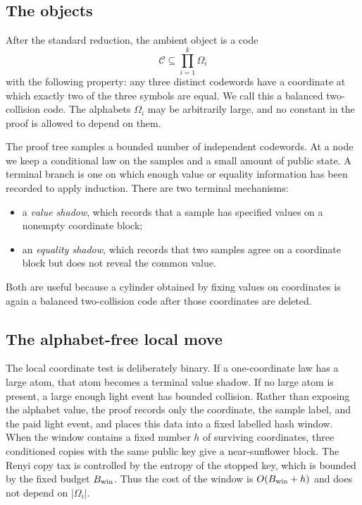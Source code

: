\documentclass[11pt]{article}
\theoremstyle{remark}
\newcommand{\C}{\mathcal C}
\begin{document}
\subsection*{The objects}

After the standard reduction, the ambient object is a code
\[
        \C\subseteq \prod_{i=1}^{k}\Omega_i
\]
with the following property: any three distinct codewords have a coordinate at
which exactly two of the three symbols are equal.  We call this a balanced
two-collision code.  The alphabets $\Omega_i$ may be arbitrarily large, and no
constant in the proof is allowed to depend on them.

The proof tree samples a bounded number of independent codewords.  At a node we
keep a conditional law on the samples and a small amount of public state.  A
terminal branch is one on which enough value or equality information has been
recorded to apply induction.  There are two terminal mechanisms:
\begin{itemize}[leftmargin=2em]
\item a \emph{value shadow}, which records that a sample has specified values
on a nonempty coordinate block;
\item an \emph{equality shadow}, which records that two samples agree on a
coordinate block but does not reveal the common value.
\end{itemize}
Both are useful because a cylinder obtained by fixing values on coordinates is
again a balanced two-collision code after those coordinates are deleted.

\subsection*{The alphabet-free local move}

The local coordinate test is deliberately binary.  If a one-coordinate law has
a large atom, that atom becomes a terminal value shadow.  If no large atom is
present, a large enough light event has bounded collision.  Rather than
exposing the alphabet value, the proof records only the coordinate, the sample
label, and the paid light event, and places this data into a fixed labelled hash
window.  When the window contains a fixed number $h$ of surviving coordinates,
three conditioned copies with the same public key give a near-sunflower block.
The Renyi copy tax is controlled by the entropy of the stopped key, which is
bounded by the fixed budget $B_{\rm win}$.  Thus the cost of the window is
$O(B_{\rm win}+h)$ and does not depend on $|\Omega_i|$.
\end{document}
